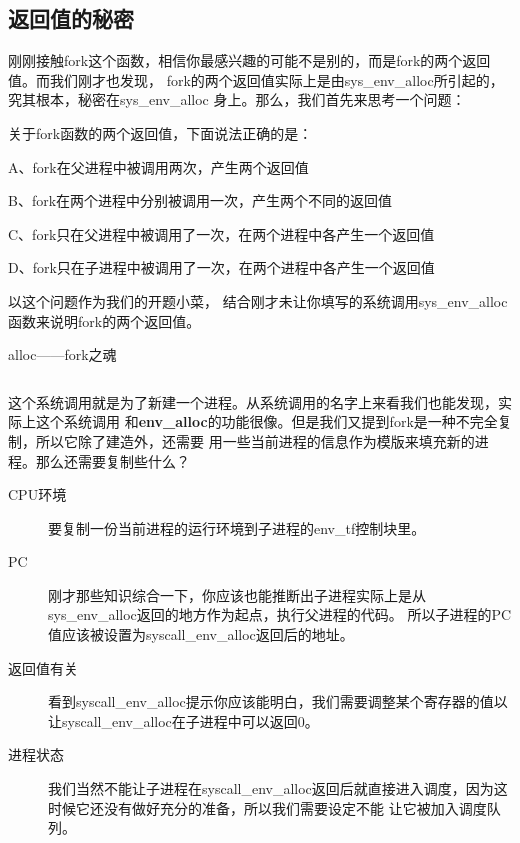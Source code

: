 \subsection{返回值的秘密}

刚刚接触fork这个函数，相信你最感兴趣的可能不是别的，而是fork的两个返回值。而我们刚才也发现，
fork的两个返回值实际上是由sys\_env\_alloc所引起的，究其根本，秘密在sys\_env\_alloc
身上。那么，我们首先来思考一个问题：

\begin{thinking}\label{think-fork的调用}
 关于fork函数的两个返回值，下面说法正确的是：

  A、fork在父进程中被调用两次，产生两个返回值

  B、fork在两个进程中分别被调用一次，产生两个不同的返回值

  C、fork只在父进程中被调用了一次，在两个进程中各产生一个返回值

  D、fork只在子进程中被调用了一次，在两个进程中各产生一个返回值
\end{thinking}

以这个问题作为我们的开题小菜，
结合刚才未让你填写的系统调用sys\_env\_alloc函数来说明fork的两个返回值。

\begin{codeBoxWithCaption}{alloc——fork之魂\label{code:sys_env_alloc.c}}
  \inputminted[linenos]{c}{codes/sys_env_alloc.c}
\end{codeBoxWithCaption}

这个系统调用就是为了新建一个进程。从系统调用的名字上来看我们也能发现，实际上这个系统调用
和\textbf{env\_alloc}的功能很像。但是我们又提到fork是一种不完全复制，所以它除了建造外，还需要
用一些当前进程的信息作为模版来填充新的进程。那么还需要复制些什么？

\begin{description}
 \item [CPU环境] 要复制一份当前进程的运行环境到子进程的env\_tf控制块里。
 \item [PC] 刚才那些知识综合一下，你应该也能推断出子进程实际上是从sys\_env\_alloc返回的地方作为起点，执行父进程的代码。
 所以子进程的PC值应该被设置为syscall\_env\_alloc返回后的地址。
 \item [返回值有关] 看到syscall\_env\_alloc提示你应该能明白，我们需要调整某个寄存器的值以让syscall\_env\_alloc在子进程中可以返回0。
 \item [进程状态] 我们当然不能让子进程在syscall\_env\_alloc返回后就直接进入调度，因为这时候它还没有做好充分的准备，所以我们需要设定不能
 让它被加入调度队列。
 \end{description}

